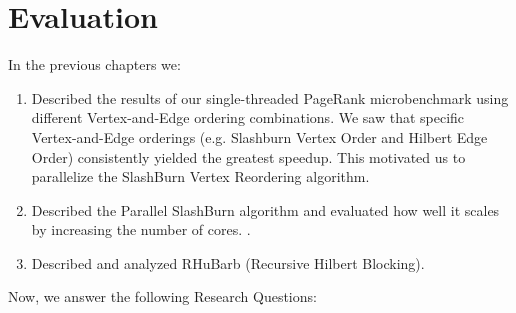 \chapter{Evaluation}
\label{ch:Evaluation}

In the previous chapters we:
\begin{enumerate}
    \item Described the results of our single-threaded PageRank microbenchmark using different Vertex-and-Edge ordering combinations. We saw that specific Vertex-and-Edge orderings (e.g. Slashburn Vertex Order and Hilbert Edge Order) consistently yielded the greatest speedup. This motivated us to parallelize the SlashBurn Vertex Reordering algorithm.
    \item Described the Parallel SlashBurn algorithm and evaluated how well it scales by increasing the number of cores.
          .
    \item Described and analyzed RHuBarb (Recursive Hilbert Blocking).
\end{enumerate}

Now, we answer the following Research Questions:

